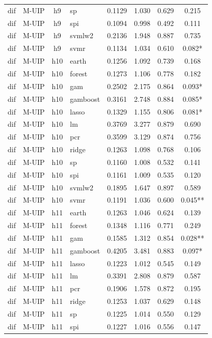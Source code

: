 \begin{ThreePartTable}
\begin{longtable}[t]{llclcccc}
dif & M-UIP & h9 & sp & 0.1129 & 1.030 & 0.629 & 0.215\\
dif & M-UIP & h9 & spi & 0.1094 & 0.998 & 0.492 & 0.111\\
dif & M-UIP & h9 & svmlw2 & 0.2136 & 1.948 & 0.887 & 0.735\\
dif & M-UIP & h9 & svmr & 0.1134 & 1.034 & 0.610 & 0.082*\\
\addlinespace
dif & M-UIP & h10 & earth & 0.1256 & 1.092 & 0.739 & 0.168\\
dif & M-UIP & h10 & forest & 0.1273 & 1.106 & 0.778 & 0.182\\
dif & M-UIP & h10 & gam & 0.2502 & 2.175 & 0.864 & 0.093*\\
dif & M-UIP & h10 & gamboost & 0.3161 & 2.748 & 0.884 & 0.085*\\
dif & M-UIP & h10 & lasso & 0.1329 & 1.155 & 0.806 & 0.081*\\
dif & M-UIP & h10 & lm & 0.3769 & 3.277 & 0.879 & 0.690\\
dif & M-UIP & h10 & pcr & 0.3599 & 3.129 & 0.874 & 0.756\\
dif & M-UIP & h10 & ridge & 0.1263 & 1.098 & 0.768 & 0.106\\
dif & M-UIP & h10 & sp & 0.1160 & 1.008 & 0.532 & 0.141\\
dif & M-UIP & h10 & spi & 0.1161 & 1.009 & 0.535 & 0.120\\
dif & M-UIP & h10 & svmlw2 & 0.1895 & 1.647 & 0.897 & 0.589\\
dif & M-UIP & h10 & svmr & 0.1191 & 1.036 & 0.600 & 0.045**\\
\addlinespace
dif & M-UIP & h11 & earth & 0.1263 & 1.046 & 0.624 & 0.139\\
dif & M-UIP & h11 & forest & 0.1348 & 1.116 & 0.771 & 0.249\\
dif & M-UIP & h11 & gam & 0.1585 & 1.312 & 0.854 & 0.028**\\
dif & M-UIP & h11 & gamboost & 0.4205 & 3.481 & 0.883 & 0.097*\\
dif & M-UIP & h11 & lasso & 0.1223 & 1.012 & 0.545 & 0.149\\
dif & M-UIP & h11 & lm & 0.3391 & 2.808 & 0.879 & 0.587\\
dif & M-UIP & h11 & pcr & 0.1906 & 1.578 & 0.872 & 0.195\\
dif & M-UIP & h11 & ridge & 0.1253 & 1.037 & 0.629 & 0.148\\
dif & M-UIP & h11 & sp & 0.1225 & 1.014 & 0.550 & 0.129\\
dif & M-UIP & h11 & spi & 0.1227 & 1.016 & 0.556 & 0.147\\

\end{longtable}
\end{ThreePartTable}
